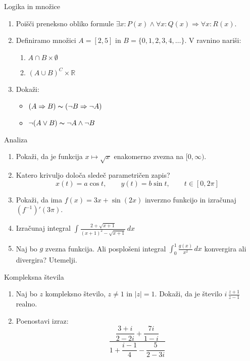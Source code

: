 \begin{frame}{Logika in množice}
	\begin{enumerate}
		\item
		Poišči preneksno obliko formule \(\exists x : P(x)\wedge \forall x : Q(x)\Rightarrow \forall x : R(x)\).
		\item 
		Definiramo množici \(A=[2,5]\) in \(B=\{0,1,2,3,4,\dots\}\).
		V ravnino nariši:
		\begin{enumerate}
		   \item \(A \cap B \times \emptyset\)
		   \item \((A \cup B)^C \times \mathbb{R}\)
		\end{enumerate}
		\item
		Dokaži:
		\begin{itemize}
			\item \((A \Rightarrow B)\thicksim (\neg B \Rightarrow \neg A)\)
			\item \(\neg(A\vee B) \thicksim \neg A \wedge \neg B\)
		\end{itemize}
	\end{enumerate}
\end{frame}

\begin{frame}{Analiza}
	\begin{enumerate}
		\item
		Pokaži, da je funkcija \(x\mapsto \sqrt{x}\) enakomerno zvezna na \([0,\infty)\).
		\item 
		Katero krivuljo določa sledeč parametričen zapis?
		$$
		   x(t) = a \cos t,\qquad %
		   y(t) = b \sin t,\qquad %
		   t \in [0, 2 \pi]
		$$ 
		\item
		Pokaži, da ima \(f(x)=3x + \sin (2x)\) inverzno funkcijo in izračunaj \((f^{-1})'(3\pi)\).
		
		\item
		Izračunaj integral 
		\(\displaystyle \int \frac{2+\sqrt{x+1}}{(x+1)^2-\sqrt{x+1}} \,dx\)
		\item 
		Naj bo $g$ zvezna funkcija. Ali posplošeni integral 
		\(\int_{0}^{1} \frac{g(x)}{x^2}\,dx\)
		konvergira ali divergira? Utemelji.
	\end{enumerate}
\end{frame}

\begin{frame}{Kompleksna števila}
	\begin{enumerate}
		\item
		Naj bo $z$ kompleksno število, $z \ne 1$ in $|z|=1$.
		Dokaži, da je število \( i \, \frac{z+1}{z-1} \) realno.
		\item
		Poenostavi izraz:
		\[\dfrac{\dfrac{3+i}{2-2i}+\dfrac{7i}{1-i}}{1+\dfrac{i-1}{4}-\dfrac{5}{2-3i}}\]
	\end{enumerate}
\end{frame}